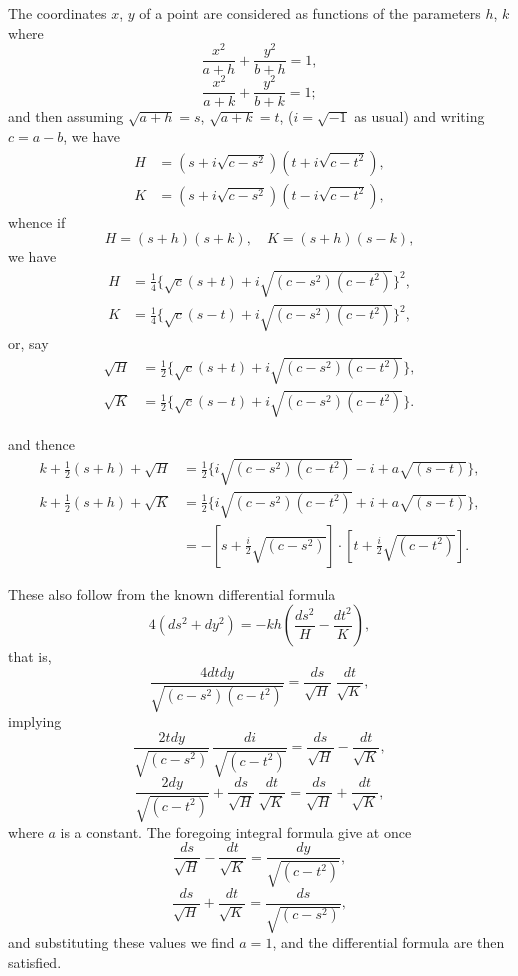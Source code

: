 \documentclass[11pt,a4paper]{article}
\theoremstyle{plain}
\theoremstyle{definition}
\begin{document}
The coordinates $x$, $y$ of a point are considered as functions of the parameters
$h$, $k$ where
\[
\frac{x^2}{a + h} + \frac{y^2}{b + h} = 1,
\]
\[
\frac{x^2}{a + k} + \frac{y^2}{b + k} = 1;
\]
and then assuming $\sqrt{a + h} = s$, $\sqrt{a + k} = t$, ($i = \sqrt{-1}$ as usual) and writing $c = a - b$,
we have
\begin{align*}
H &= (s + i \sqrt{c - s^2})(t + i \sqrt{c - t^2}), \\
K &= (s + i \sqrt{c - s^2})(t - i \sqrt{c - t^2}),
\end{align*}
whence if
\[
H = (s + h)(s + k), \quad K = (s + h)(s - k),
\]
we have
\begin{align*}
H &= \tfrac{1}{4}\{\sqrt{c}(s + t) + i \sqrt{(c - s^2)(c - t^2)}\}^2, \\
K &= \tfrac{1}{4}\{\sqrt{c}(s - t) + i \sqrt{(c - s^2)(c - t^2)}\}^2,
\end{align*}
or, say
\begin{align*}
\sqrt{H} &= \tfrac{1}{2}\{\sqrt{c}(s + t) + i \sqrt{(c - s^2)(c - t^2)}\}, \\
\sqrt{K} &= \tfrac{1}{2}\{\sqrt{c}(s - t) + i \sqrt{(c - s^2)(c - t^2)}\}.
\end{align*}

\clearpage

\noindent
and thence
\begin{align*}
k + \tfrac{1}{2}(s + h) + \sqrt{H} &= \tfrac{1}{2}\{i \sqrt{(c - s^2)(c - t^2)} - i + a \sqrt{(s - t)}\}, \\
k + \tfrac{1}{2}(s + h) + \sqrt{K} &= \tfrac{1}{2}\{i \sqrt{(c - s^2)(c - t^2)} + i + a \sqrt{(s - t)}\}, \\
&= -[s + \tfrac{i}{2}\sqrt{(c - s^2)}] \cdot [t + \tfrac{i}{2}\sqrt{(c - t^2)}].
\end{align*}

These also follow from the known differential formula
\[
4(ds^2 + dy^2) = -k h \left(\frac{ds^2}{H} - \frac{dt^2}{K}\right),
\]
that is,
\[
\frac{4 dt dy}{\sqrt{(c - s^2)(c - t^2)}} = \frac{ds}{\sqrt{H}}\;\frac{dt}{\sqrt{K}},
\]
implying
\[
\frac{2 t dy}{\sqrt{(c - s^2)}}\,\frac{di}{\sqrt{(c - t^2)}} = \frac{ds}{\sqrt{H}} - \frac{dt}{\sqrt{K}},
\]
\[
\frac{2 dy}{\sqrt{(c - t^2)}} + \frac{ds}{\sqrt{H}}\,\frac{dt}{\sqrt{K}} = \frac{ds}{\sqrt{H}} + \frac{dt}{\sqrt{K}},
\]
where $a$ is a constant.  The foregoing integral formula give at once
\[
\frac{ds}{\sqrt{H}} - \frac{dt}{\sqrt{K}} = \frac{dy}{\sqrt{(c - t^2)}},
\]
\[
\frac{ds}{\sqrt{H}} + \frac{dt}{\sqrt{K}} = \frac{ds}{\sqrt{(c - s^2)}},
\]
and substituting these values we find $a = 1$, and the differential formula are then
satisfied.
\end{document}
